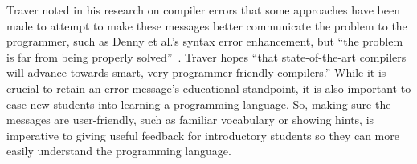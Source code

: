 \documentclass{sig-alternate}
\begin{document}
Traver noted in his research on compiler errors that some approaches have been made to attempt to make these messages better communicate the problem to the programmer, such as Denny et al.'s syntax error enhancement, but ``the problem is far from being properly solved''~\cite{Traver:2010}. 
Traver hopes ``that state-of-the-art compilers will advance towards smart, very programmer-friendly compilers.''
While it is crucial to retain an error message's educational standpoint, it is also important to ease new students into learning a programming language.
So, making sure the messages are user-friendly, such as familiar vocabulary or showing hints, is imperative to giving useful feedback for introductory students so they can more easily understand the programming language.



  

\end{document}

